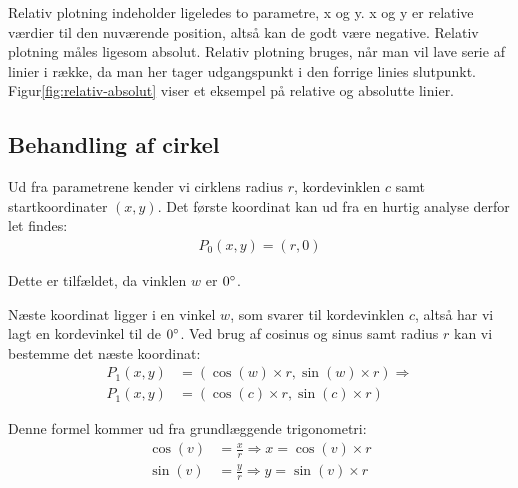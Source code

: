 Relativ plotning indeholder ligeledes to parametre, x og y. x og y er
relative værdier til den nuværende position, altså kan de godt være
negative. Relativ plotning måles ligesom absolut. Relativ plotning
bruges, når man vil lave serie af linier i række, da man her tager
udgangspunkt i den forrige linies
slutpunkt. Figur\vref{fig:relativ-absolut} viser et eksempel på
relative og absolutte linier.

\subsection{Behandling af cirkel}
\label{sc:matematik-cirkel}

Ud fra parametrene kender vi cirklens radius $r$, kordevinklen $c$ samt startkoordinater
$(x, y)$. Det første koordinat kan ud fra en hurtig analyse derfor let
findes:
\begin{align*}
  P_0(x, y) = (r, 0)
\end{align*}


Dette er tilfældet, da vinklen $w$ er $0^\circ$.

Næste koordinat ligger i en vinkel $w$, som svarer til kordevinklen
$c$, altså har vi lagt en kordevinkel til de $0^\circ$. Ved brug af
cosinus og sinus samt radius $r$ kan vi bestemme det næste koordinat:
\begin{align}
  P_1(x, y) &= \left( \cos(w) \times r, \sin(w) \times r \right) \Rightarrow \nonumber \\
  P_1(x, y) &= \left( \cos(c) \times r, \sin(c) \times r \right) \label{eq:8.1}
\end{align}
 
Denne formel kommer ud fra grundlæggende trigonometri:
\begin{align*}
  \cos(v) &= \frac{x}{r} \Rightarrow x = \cos(v)\times r \\
  \sin(v) &= \frac{y}{r} \Rightarrow y = \sin(v)\times r
\end{align*}
 
